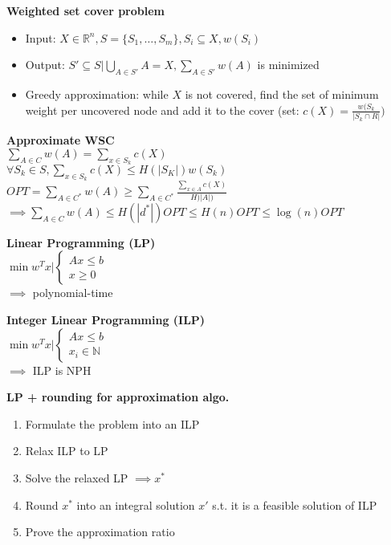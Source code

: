 \documentclass[10pt,letterpaper,landscape]{report}
\newcommand{\boxheight}{21.59cm}
\newcommand{\boxwidth}{8.85cm}
\begin{document}
\begin{small}
{\begin{minipage}[t][\boxheight][c]{\boxwidth}
    \textbf{Weighted set cover problem}
    \begin{itemize}
        \item Input: $X \in \mathbb{R}^n, S = \{S_1,\dots, S_m\}, S_i \subseteq X, w(S_i)$
        \item Output: $S' \subseteq S | \bigcup\limits_{A\in S'} A = X, \sum\limits_{A\in S'}w(A)$ is minimized
        \item Greedy approximation: while $X$ is not covered, find the set of minimum weight per uncovered node and add it to the cover (set: $c(X) = \frac{w(S_k}{|S_k \cap R |})$
    \end{itemize}
    
    \textbf{Approximate WSC}\\
    $\sum_{A\in C}w(A) = \sum_{x\in S_k} c(X)$\\
    $\forall S_k \in S, \sum_{x\in S_k} c(X) \leq H(|S_K|)w(S_k)$\\
    $OPT = \sum_{A\in C^*} w(A) \geq \sum_{A\in C^*} \frac{\sum_{x\in A}c(X)}{H)|A|)}$\\
    $\implies \sum_{A\in C} w(A) \leq H(|d^*|) OPT \leq H(n) OPT \leq \log(n)OPT$

    \textbf{Linear Programming (LP)}\\
    $\min w^Tx | \left\{\begin{array}{l}
        Ax \leq b \\
        x \geq 0
    \end{array}\right.$\\
    $\implies$ polynomial-time
    
    \textbf{Integer Linear Programming (ILP)}\\
    $\min w^Tx | \left\{\begin{array}{c}
        Ax \leq b \\
        x_i \in \mathbb{N}
    \end{array}\right.$\\
    $\implies$ ILP is NPH
    
    \textbf{LP + rounding for approximation algo.}
    \begin{enumerate}
        \item Formulate the problem into an ILP
        \item Relax ILP to LP
        \item Solve the relaxed LP $\implies x^*$
        \item Round $x^*$ into an integral solution $x'$ s.t. it is a feasible solution of ILP
        \item Prove the approximation ratio
    \end{enumerate}
    

\end{minipage}}
\end{small}
\end{document}
